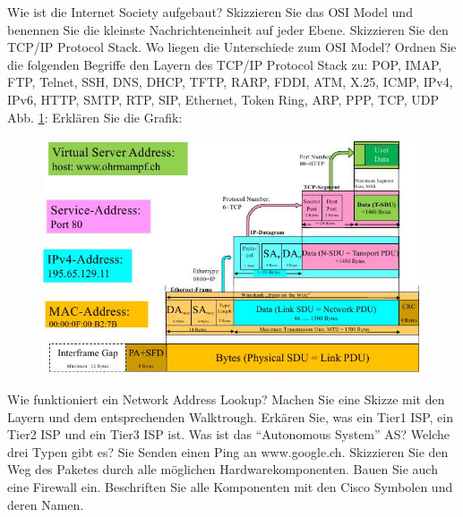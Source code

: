 \documentclass[ngerman,a4paper,12pt]{scrreprt}
\begin{document}
\olR
	\li Wie ist die Internet Society aufgebaut?
	\li Skizzieren Sie das OSI Model und benennen Sie die kleinste Nachrichteneinheit auf jeder Ebene.
	\li Skizzieren Sie den TCP/IP Protocol Stack. Wo liegen die Unterschiede zum OSI Model?
	\li Ordnen Sie die folgenden Begriffe den Layern des TCP/IP Protocol Stack zu:  POP, IMAP, FTP, Telnet, SSH, DNS, DHCP, TFTP, RARP, FDDI, ATM, X.25, ICMP, IPv4, IPv6, HTTP, SMTP, RTP, SIP, Ethernet, Token Ring, ARP, PPP, TCP, UDP
	\li Abb. \ref{LayNewoStr}: Erklären Sie die Grafik:
	\begin{figure}[H]
		\centering
		\includegraphics[width=\textwidth]{img/R8.1.jpg}
		\caption{}
		\label{LayNewoStr}
	\end{figure}
	\li 
	Wie funktioniert ein Network Address Lookup? Machen Sie eine Skizze mit den Layern und dem entsprechenden Walktrough.
	\li Erkären Sie, was ein Tier1 ISP, ein Tier2 ISP und ein Tier3 ISP ist.
	\li Was ist das "`Autonomous System"' AS? Welche drei Typen gibt es?
	\li Sie Senden einen Ping an www.google.ch. Skizzieren Sie den Weg des Paketes durch alle möglichen Hardwarekomponenten. Bauen Sie auch eine Firewall ein. Beschriften Sie alle Komponenten mit den Cisco Symbolen und deren Namen.
\olS
\end{document}
